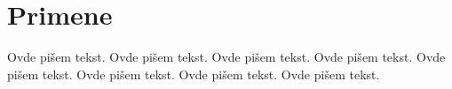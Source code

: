 \section{Primene}
\label{sec:primene}


Ovde pišem tekst.
Ovde pišem tekst.
Ovde pišem tekst.
Ovde pišem tekst.
Ovde pišem tekst.
Ovde pišem tekst.
Ovde pišem tekst.
Ovde pišem tekst.
